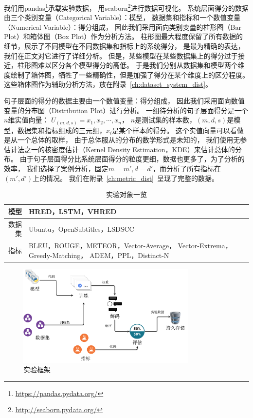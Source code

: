 我们用pandas\footnote{\url{https://pandas.pydata.org/}}承载实验数据，
用seaborn\footnote{\url{http://seaborn.pydata.org/}}进行数据可视化。
系统层面得分的数据由三个类别变量（Categorical Variable）：模型，
数据集和指标和一个数值变量（Numerical Variable）：得分组成，
因此我们采用面向类别变量的柱形图（Bar Plot）和箱体图（Box Plot）作为分析方法。
柱形图最大程度保留了所有数据的细节，展示了不同模型在不同数据集和指标上的系统得分，
是最为精确的表达，我们在正文对它进行了详细分析。
但是，某些模型在某些数据集上的得分过于接近，柱形图难以区分各个模型得分的高低。
于是我们分别从数据集和模型两个维度绘制了箱体图，牺牲了一些精确性，但是加强了得分在某个维度上的区分程度。
这些箱体图作为辅助分析方法，放在附录~\ref{ch:dataset_system_dist}。

句子层面的得分的数据主要由一个数值变量：得分组成，
因此我们采用面向数值变量的分布图（Distribution Plot）进行分析。
一组待分析的句子层面得分是一个$n$维实值向量： $U_{(m, d, s)} = x_1, x_2, \cdots, x_n$，
$n$是测试集的样本数，$(m, d, s)$是模型，数据集和指标组成的三元组，$x_i$是某个样本的得分。
这个实值向量可以看做是从一个总体的取样，
由于总体服从的分布的数学形式是未知的，
我们使用无参估计法之一的核密度估计（Kernel Density Estimation，KDE）来估计总体的分布。
由于句子层面得分比系统层面得分的粒度更细，数据也更多了，为了分析的效率，
我们选择了案例分析，固定$m = m', d = d'$，而分析了所有指标在$(m', d')$上的情况。
我们在附录~\ref{ch:metric_dist}~呈现了完整的数据。

\begin{table}[H]
    \centering
    \caption{实验对象一览}
    \label{tab:experiment_triples}
    \begin{tabular}{|r|m{}|}
        \hline
        模型 & HRED，LSTM，VHRED \\
        \hline
        数据集 & Ubuntu，OpenSubtitles，LSDSCC \\
        \hline
        指标 & BLEU，ROUGE，METEOR，Vector-Average，
        Vector-Extrema，Greedy-Matching，
        ADEM，PPL，Distinct-N \\
        \hline
    \end{tabular}
\end{table}

\begin{figure}[H]
    \centering
    \includegraphics[width=0.8\textwidth]{figure/drawio/eval_v4.pdf}
    \caption{实验框架}
    \label{fig:framework}
\end{figure}

